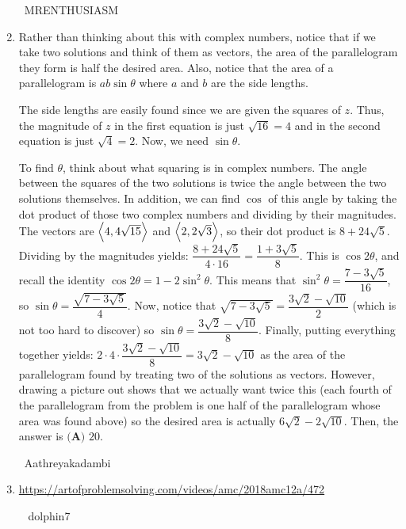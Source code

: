 \documentclass{article}%
\begin{document}
\begin{enumerate}
~MRENTHUSIASM

%
\item%
Rather than thinking about this with complex numbers, notice that if we take two solutions and think of them as vectors, the area of the parallelogram they form is half the desired area. Also, notice that the area of a parallelogram is $ab\sin \theta$ where $a$ and $b$ are the side lengths. 

The side lengths are easily found since we are given the squares of $z$. Thus, the magnitude of $z$ in the first equation is just $\sqrt{16} = 4$ and in the second equation is just $\sqrt{4} = 2$. Now, we need $\sin \theta$. 

To find $\theta$, think about what squaring is in complex numbers. The angle between the squares of the two solutions is twice the angle between the two solutions themselves. In addition, we can find $\cos$ of this angle by taking the dot product of those two complex numbers and dividing by their magnitudes. The vectors are $\Bigl\langle 4, 4\sqrt{15}\Bigr\rangle$ and $\Bigl\langle 2, 2\sqrt{3}\Bigr\rangle$, so their dot product is $8 + 24\sqrt{5}$. Dividing by the magnitudes yields: $\dfrac{8+24\sqrt{5}}{4 \cdot 16} = \dfrac{1 + 3\sqrt{5}}{8}$. This is $\cos 2\theta$, and recall the identity $\cos 2\theta = 1 - 2\sin^2 \theta$. This means that $\sin^2 \theta = \dfrac{7 - 3\sqrt{5}}{16}$, so $\sin \theta = \dfrac{\sqrt{7-  3\sqrt{5}}}{4}$. Now, notice that $\sqrt{7-  3\sqrt{5}} = \dfrac{3\sqrt{2}-\sqrt{10}}{2}$ (which is not too hard to discover) so $\sin \theta = \dfrac{3\sqrt{2}-\sqrt{10}}{8}$. Finally, putting everything together yields: $2\cdot 4 \cdot \dfrac{3\sqrt{2}-\sqrt{10}}{8} = 3\sqrt{2} - \sqrt{10}$ as the area of the parallelogram found by treating two of the solutions as vectors. However, drawing a picture out shows that we actually want twice this (each fourth of the parallelogram from the problem is one half of the parallelogram whose area was found above) so the desired area is actually $6\sqrt{2} - 2\sqrt{10}$. Then, the answer is $\boxed{\textbf{(A) } 20}$.

~Aathreyakadambi

%
\item%
\href{https://artofproblemsolving.com/videos/amc/2018amc12a/472}{https://artofproblemsolving.com/videos/amc/2018amc12a/472}

~ dolphin7

%
\end{enumerate}

%
\end{document}
